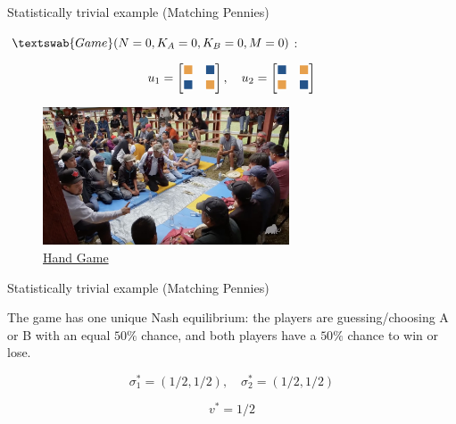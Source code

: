 \documentclass{beamer}
\newcommand{\wbox}{\textcolor{w}{\blacksquare}}
\newcommand{\lbox}{\textcolor{l}{\blacksquare}}
\theoremstyle{definition}
\newcommand{\G}[1]{$\textswab{Game}(#1)$}
\begin{document}
\begin{frame}{Statistically trivial example (Matching Pennies)}

\G{N=0,K_A=0,K_B=0,M=0}:

\begin{equation*}
u_1=
\begin{bmatrix}
\wbox & \lbox \\
\lbox & \wbox
\end{bmatrix}, \quad
u_2=
\begin{bmatrix}
\lbox & \wbox \\
\wbox & \lbox
\end{bmatrix}
\end{equation*}

\pause

\begin{figure}[H]
    \centering
    \includegraphics[width=0.65\textwidth]{img/HandGame.jpg}
    \caption{\small \href{https://www.youtube.com/watch?v=IgznW43DLbg}{Hand Game}}
    \label{fig:HandGame}
\end{figure}

\end{frame}

\begin{frame}{Statistically trivial example (Matching Pennies)}

The game has one unique Nash equilibrium: the players are guessing/choosing
A or B with an equal $50\%$ chance, and both players have a $50\%$ chance to win or lose.

\[
\sigma_1^* = (1/2,1/2), \quad \sigma_2^* = (1/2,1/2)
\]

\[
v^* = 1/2
\]

\end{frame}
\end{document}
